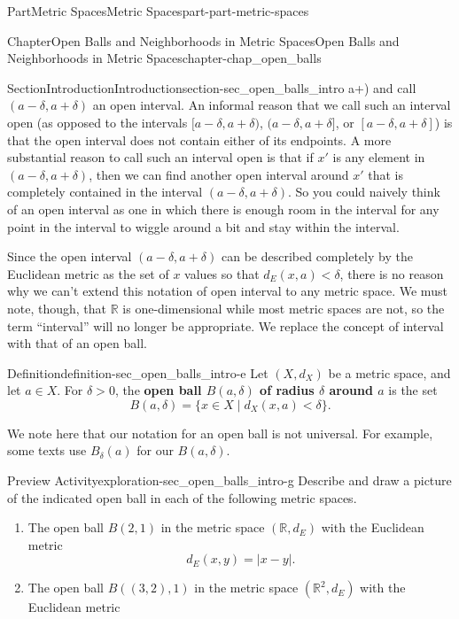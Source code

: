 \documentclass[oneside,10pt,]{book}
\newcommand{\terminology}[1]{\textbf{#1}}
\numberwithin{equation}{chapter}
\newcommand{\R}{\mathbb{R}}
\newcommand{\lt}{<}
\newcommand{\gt}{>}
\begin{document}
\begin{partptx}{Part}{Metric Spaces}{}{Metric Spaces}{}{}{part-part-metric-spaces}
\begin{chapterptx}{Chapter}{Open Balls and Neighborhoods in Metric Spaces}{}{Open Balls and Neighborhoods in Metric Spaces}{}{}{chapter-chap_open_balls}
\begin{sectionptx}{Section}{Introduction}{}{Introduction}{}{}{section-sec_open_balls_intro}
a+\delta)\) and call \((a-\delta,
a+\delta)\) an open interval. An informal reason that we call such an interval open (as opposed to the intervals \([a-\delta,
a+\delta)\), \((a-\delta, a+\delta]\), or \([a-\delta,
a+\delta]\)) is that the open interval does not contain either of its endpoints. A more substantial reason to call such an interval open is that if \(x'\) is any element in \((a-\delta,
a+\delta)\), then we can find another open interval around \(x'\) that is completely contained in the interval \((a-\delta,
a+\delta)\). So you could naively think of an open interval as one in which there is enough room in the interval for any point in the interval to wiggle around a bit and stay within the interval.%
\par
Since the open interval \((a-\delta,
a+\delta)\) can be described completely by the Euclidean metric as the set of \(x\) values so that \(d_E(x,a) \lt \delta\), there is no reason why we can't extend this notation of open interval to any metric space. We must note, though, that \(\R\) is one-dimensional while most metric spaces are not, so the term ``interval'' will no longer be appropriate. We replace the concept of interval with that of an open ball.%
\begin{definition}{Definition}{}{definition-sec_open_balls_intro-e}%
%
Let \((X, d_X)\) be a metric space, and let \(a \in X\). For \(\delta \gt 0\), the \terminology{open ball \(B(a, \delta)\) of radius \(\delta\) around \(a\)} is the set%
\begin{equation*}
B(a, \delta) = \{x \in X \mid d_X(x,a) \lt  \delta\}\text{.}
\end{equation*}
%
\end{definition}
We note here that our notation for an open ball is not universal. For example, some texts use \(B_{\delta}(a)\) for our \(B(a,\delta)\).%
\begin{exploration}{Preview Activity}{}{exploration-sec_open_balls_intro-g}%
Describe and draw a picture of the indicated open ball in each of the following metric spaces.%
\begin{enumerate}[font=\bfseries,label=(\alph*),ref=\alph*]%
\item{}The open ball \(B(2, 1)\) in the metric space \((\R, d_E)\) with the Euclidean metric%
\begin{equation*}
d_E(x,y) = | x-y |\text{.}
\end{equation*}
%
\item{}The open ball \(B((3,2), 1)\) in the metric space \((\R^2, d_E)\) with the Euclidean metric%

\end{enumerate}
\end{exploration}
\end{sectionptx}
\end{chapterptx}
\end{partptx}
\end{document}
